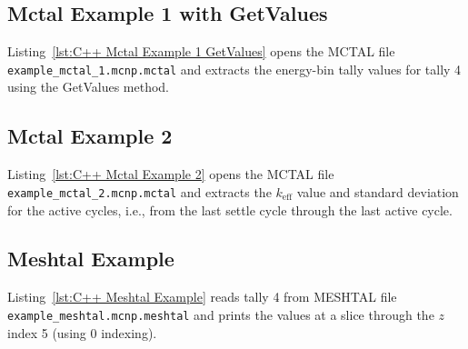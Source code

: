\documentclass[11pt]{article}
\begin{document}


\clearpage
\subsection{Mctal Example 1 with GetValues}\label{mctal-example-1-getvalues}

Listing~\ref{lst:C++ Mctal Example 1 GetValues} opens the MCTAL file
\texttt{example\_mctal\_1.mcnp.mctal} and extracts the
energy-bin tally values for tally 4 using the GetValues method.



\clearpage
\subsection{Mctal Example 2}\label{mctal-example-2}

Listing~\ref{lst:C++ Mctal Example 2} opens the MCTAL file
\texttt{example\_mctal\_2.mcnp.mctal} and extracts the $k_{\mathrm{eff}}$ value
and standard deviation for the active cycles, i.e., from the last settle cycle
through the last active cycle.



\clearpage
\subsection{Meshtal Example}\label{meshtal-example}

Listing~\ref{lst:C++ Meshtal Example} reads tally 4 from MESHTAL file
\texttt{example\_meshtal.mcnp.meshtal} and prints the values at a slice through
the $z$ index 5 (using 0 indexing).


\end{document}
